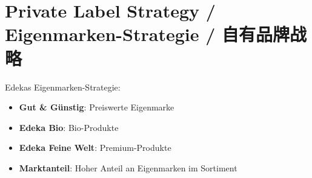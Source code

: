 \section{Private Label Strategy / Eigenmarken-Strategie / 自有品牌战略}

\begin{otherlanguage}{ngerman}
Edekas Eigenmarken-Strategie:
\begin{itemize}
    \item \textbf{Gut \& Günstig}: Preiswerte Eigenmarke
    \item \textbf{Edeka Bio}: Bio-Produkte
    \item \textbf{Edeka Feine Welt}: Premium-Produkte
    \item \textbf{Marktanteil}: Hoher Anteil an Eigenmarken im Sortiment
\end{itemize}
\end{otherlanguage}

